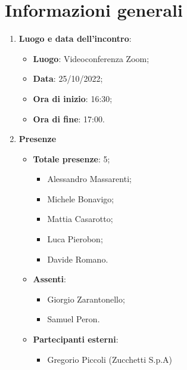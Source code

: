 \section{Informazioni generali}

\begin{enumerate}
    \item \textbf{Luogo e data dell'incontro}:
    \begin{itemize}
        \item \textbf{Luogo}: Videoconferenza Zoom;
        \item \textbf{Data}: 25/10/2022;
        \item \textbf{Ora di inizio}: 16:30;
        \item \textbf{Ora di fine}: 17:00.
    \end{itemize}
    \item \textbf{Presenze}
    \begin{itemize}
        \item \textbf{Totale presenze}: 5;
        \begin{itemize}
            \item Alessandro Massarenti;
            \item Michele Bonavigo;
            \item Mattia Casarotto;
            \item Luca Pierobon;
            \item Davide Romano.
        \end{itemize}
        \item \textbf{Assenti}:
        \begin{itemize}
            \item Giorgio Zarantonello;
            \item Samuel Peron.
        \end{itemize}
        \item \textbf{Partecipanti esterni}:
        \begin{itemize}
            \item Gregorio Piccoli (Zucchetti S.p.A)
        \end{itemize}
    \end{itemize}
\end{enumerate}
